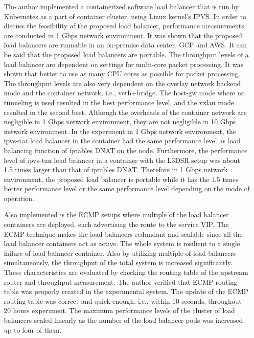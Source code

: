 The author implemented a containerized software load balancer that is run by Kubernetes as a part of container cluster, using Linux kernel's IPVS.
In order to discuss the feasibility of the proposed load balancer, performance measurements are conducted in 1 Gbps network environment.
It was shown that the proposed load balancers are runnable in an on-premise data center, GCP and AWS.
It can be said that the proposed load balancers are portable.
The throughput levels of a load balancer are dependent on settings for multi-core packet processing.
It was shown that better to use as many CPU cores as possible for packet processing.
The throughput levels are also very dependent on the overlay network backend mode and the container network, i.e., veth+bridge.
The host-gw mode where no tunneling is used resulted in the best performance level, and the vxlan mode resulted in the second best.
Although the overheads of the container network are negligible in 1 Gbps network environment, they are not negligible in 10 Gbps network environment.
In the experiment in 1 Gbps network environment, the ipvs-nat load balancer in the container had the same performance level as load balancing function of iptables DNAT on the node.
Furthermore, the performance level of ipvs-tun load balancer in a container with the L3DSR setup was about 1.5 times larger than that of iptables DNAT.
Therefore in 1 Gbps network environment, the proposed load balancer is portable while it has the 1.5 times better performance level or the same performance level depending on the mode of operation.

Also implemented is the ECMP setups where multiple of the load balancer containers are deployed, each advertising the route to the service VIP.
The ECMP technique makes the load balancers redundant and scalable since all the load balancer containers act as active.
The whole system is resilient to a single failure of load balancer container.
Also by utilizing multiple of load balancers simultaneously, the throughput of the total system is increased significantly.
These characteristics are evaluated by checking the routing table of the upstream router and throughput measurement.
The author verified that ECMP routing table was properly created in the experimental system.
The update of the ECMP routing table was correct and quick enough, i.e., within 10 seconds, throughout 20 hours experiment.
The maximum performance levels of the cluster of load balancers scaled linearly as the number of the load balancer pods was increased up to four of them.

